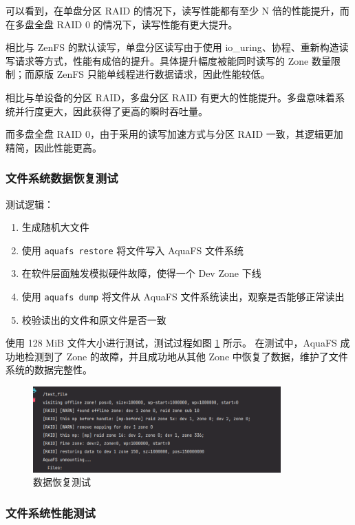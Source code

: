 可以看到，在单盘分区 RAID 的情况下，读写性能都有至少 N 倍的性能提升，而在多盘全盘 RAID 0 的情况下，读写性能有更大提升。

相比与 ZenFS 的默认读写，单盘分区读写由于使用 io\_uring、协程、重新构造读写请求等方式，性能有成倍的提升。具体提升幅度被能同时读写的 Zone 数量限制；而原版 ZenFS 只能单线程进行数据请求，因此性能较低。

相比与单设备的分区 RAID，多盘分区 RAID 有更大的性能提升。多盘意味着系统并行度更大，因此获得了更高的瞬时吞吐量。

而多盘全盘 RAID 0，由于采用的读写加速方式与分区 RAID 一致，其逻辑更加精简，因此性能更高。

\subsubsection{文件系统数据恢复测试}

测试逻辑：

\begin{enumerate}
  \item 生成随机大文件
  \item 使用 \verb|aquafs restore| 将文件写入 AquaFS 文件系统
  \item 在软件层面触发模拟硬件故障，使得一个 Dev Zone 下线
  \item 使用 \verb|aquafs dump| 将文件从 AquaFS 文件系统读出，观察是否能够正常读出
  \item 校验读出的文件和原文件是否一致
\end{enumerate}

使用 128 MiB 文件大小进行测试，测试过程如图 \ref{test-recovery} 所示。
在测试中，AquaFS 成功地检测到了 Zone 的故障，并且成功地从其他 Zone 中恢复了数据，维护了文件系统的数据完整性。

\begin{figure}[htbp]
  \centering
  \includegraphics[width=0.85\textwidth]{fig/test-recovery.png}
  \caption{ 数据恢复测试 }
  \label{test-recovery}
\end{figure}

\subsubsection{文件系统性能测试}

